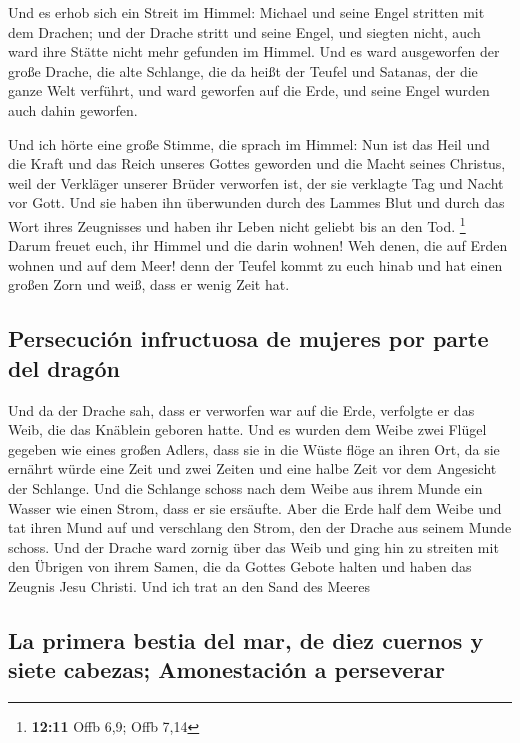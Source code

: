  Und es erhob sich ein Streit im Himmel: Michael und seine
Engel stritten mit dem Drachen; und der Drache stritt und seine Engel,
 und siegten nicht, auch ward ihre Stätte nicht mehr
gefunden im Himmel.  Und es ward ausgeworfen der große
Drache, die alte Schlange, die da heißt der Teufel und Satanas, der die
ganze Welt verführt, und ward geworfen auf die Erde, und seine Engel
wurden auch dahin geworfen.

 Und ich hörte eine große Stimme, die sprach im Himmel:
Nun ist das Heil und die Kraft und das Reich unseres Gottes geworden und
die Macht seines Christus, weil der Verkläger unserer Brüder verworfen
ist, der sie verklagte Tag und Nacht vor Gott.  Und sie
haben ihn überwunden durch des Lammes Blut und durch das Wort ihres
Zeugnisses und haben ihr Leben nicht geliebt bis an den Tod. \footnote{\textbf{12:11}
  Offb 6,9; Offb 7,14}  Darum freuet euch, ihr Himmel und
die darin wohnen! Weh denen, die auf Erden wohnen und auf dem Meer! denn
der Teufel kommt zu euch hinab und hat einen großen Zorn und weiß, dass
er wenig Zeit hat.

\hypertarget{persecuciuxf3n-infructuosa-de-mujeres-por-parte-del-draguxf3n}{%
\subsection{Persecución infructuosa de mujeres por parte del
dragón}\label{persecuciuxf3n-infructuosa-de-mujeres-por-parte-del-draguxf3n}}

 Und da der Drache sah, dass er verworfen war auf die
Erde, verfolgte er das Weib, die das Knäblein geboren hatte.
 Und es wurden dem Weibe zwei Flügel gegeben wie eines
großen Adlers, dass sie in die Wüste flöge an ihren Ort, da sie ernährt
würde eine Zeit und zwei Zeiten und eine halbe Zeit vor dem Angesicht
der Schlange.  Und die Schlange schoss nach dem Weibe aus
ihrem Munde ein Wasser wie einen Strom, dass er sie ersäufte.
 Aber die Erde half dem Weibe und tat ihren Mund auf und
verschlang den Strom, den der Drache aus seinem Munde schoss.
 Und der Drache ward zornig über das Weib und ging hin zu
streiten mit den Übrigen von ihrem Samen, die da Gottes Gebote halten
und haben das Zeugnis Jesu Christi.  Und ich trat an den
Sand des Meeres

\hypertarget{la-primera-bestia-del-mar-de-diez-cuernos-y-siete-cabezas-amonestaciuxf3n-a-perseverar}{%
\subsection{La primera bestia del mar, de diez cuernos y siete cabezas;
Amonestación a
perseverar}\label{la-primera-bestia-del-mar-de-diez-cuernos-y-siete-cabezas-amonestaciuxf3n-a-perseverar}}

